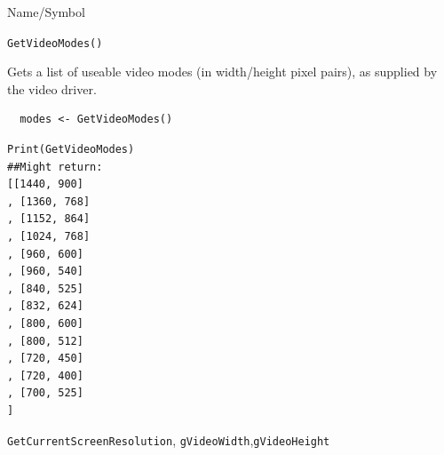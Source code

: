 \begin{desc}{Name/Symbol}
\item[Name/Symbol]	\verb+GetVideoModes()+

\item[Description] Gets a list of useable video modes (in width/height pixel pairs), as supplied by the video driver.

\item[Usage]
\begin{verbatim}
  modes <- GetVideoModes()
\end{verbatim}

\item[Example]
\begin{verbatim}
Print(GetVideoModes)
##Might return:
[[1440, 900]
, [1360, 768]
, [1152, 864]
, [1024, 768]
, [960, 600]
, [960, 540]
, [840, 525]
, [832, 624]
, [800, 600]
, [800, 512]
, [720, 450]
, [720, 400]
, [700, 525]
]
\end{verbatim}

\item[See Also]	
\verb+GetCurrentScreenResolution+, \verb+gVideoWidth+,\verb+gVideoHeight+
\end{desc}



